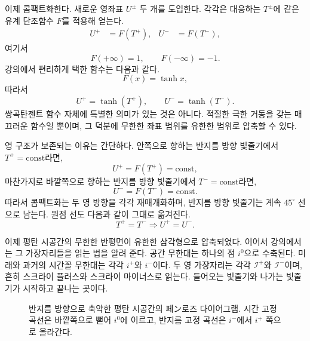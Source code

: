 이제 콤팩트화한다. 새로운 영좌표 \(U^\pm\) 두 개를 도입한다. 각각은 대응하는 \(T^\pm\)에 같은 유계 단조함수 \(F\)를 적용해 얻는다.
\begin{align}
U^+ &= F(T^+), &
U^- &= F(T^-),
\end{align}
여기서
\begin{equation}
F(+\infty)=1,
\qquad
F(-\infty)=-1.
\end{equation}
강의에서 편리하게 택한 함수는 다음과 같다.
\begin{equation}
F(x)=\tanh x,
\end{equation}
따라서
\begin{equation}
U^+ = \tanh(T^+),
\qquad
U^- = \tanh(T^-).
\end{equation}
쌍곡탄젠트 함수 자체에 특별한 의미가 있는 것은 아니다. 적절한 극한 거동을 갖는 매끄러운 함수일 뿐이며, 그 덕분에 무한한 좌표 범위를 유한한 범위로 압축할 수 있다.

영 구조가 보존되는 이유는 간단하다. 안쪽으로 향하는 반지름 방향 빛줄기에서 \(T^+=\text{const}\)라면,
\[
U^+=F(T^+)=\text{const},
\]
마찬가지로 바깥쪽으로 향하는 반지름 방향 빛줄기에서 \(T^-=\text{const}\)라면,
\[
U^-=F(T^-)=\text{const}.
\]
따라서 콤팩트화는 두 영 방향을 각각 재매개화하며, 반지름 방향 빛줄기는 계속 \(45^\circ\) 선으로 남는다. 원점 선도 다음과 같이 그대로 옮겨진다.
\[
T^+=T^- \Longrightarrow U^+=U^-.
\]

이제 평탄 시공간의 무한한 반평면이 유한한 삼각형으로 압축되었다. 이어서 강의에서는 그 가장자리들을 읽는 법을 알려 준다. 공간 무한대는 하나의 점 \(i^0\)으로 수축된다. 미래와 과거의 시간꼴 무한대는 각각 \(i^+\)와 \(i^-\)이다. 두 영 가장자리는 각각 \(\mathcal{I}^+\)와 \(\mathcal{I}^-\)이며, 흔히 스크라이 플러스와 스크라이 마이너스로 읽는다. 들어오는 빛줄기와 나가는 빛줄기가 시작하고 끝나는 곳이다.

\begin{figure}[htbp]
\centering
{}
\caption{반지름 방향으로 축약한 평탄 시공간의 페ン로즈 다이어그램. 시간 고정 곡선은 바깥쪽으로 뻗어 \(i^0\)에 이르고, 반지름 고정 곡선은 \(i^-\)에서 \(i^+\) 쪽으로 올라간다.}
\end{figure}

